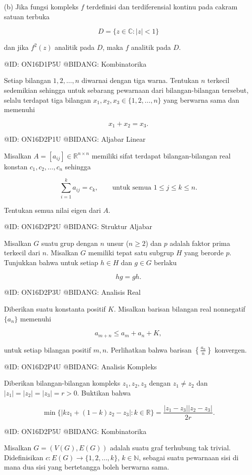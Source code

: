 (b) Jika fungsi kompleks $f$ terdefinisi dan terdiferensial kontinu pada cakram satuan terbuka

$$
D=\{z\in\mathbb C:|z|<1\}
$$

dan jika $f^2(z)$ analitik pada $D$, maka $f$ analitik pada $D$.

@ID: ON16D1P5U
@BIDANG: Kombinatorika

Setiap bilangan $1,2,\ldots,n$ diwarnai dengan tiga warna. Tentukan $n$ terkecil sedemikian sehingga untuk sebarang pewarnaan dari bilangan-bilangan tersebut, selalu terdapat tiga bilangan $x_1,x_2,x_3\in\{1,2,\ldots,n\}$ yang berwarna sama dan memenuhi

$$
x_1+x_2=x_3.
$$

@ID: ON16D2P1U
@BIDANG: Aljabar Linear

Misalkan $A=[a_{ij}]\in\mathbb R^{n\times n}$ memiliki sifat terdapat bilangan-bilangan real konstan $c_1,c_2,\ldots,c_n$ sehingga

$$
\sum_{i=1}^{k}a_{ij}=c_k,
\qquad
\text{untuk semua }1\le j\le k\le n.
$$

Tentukan semua nilai eigen dari $A$.

@ID: ON16D2P2U
@BIDANG: Struktur Aljabar

Misalkan $G$ suatu grup dengan $n$ unsur ($n\ge2$) dan $p$ adalah faktor prima terkecil dari $n$. Misalkan $G$ memiliki tepat satu subgrup $H$ yang berorde $p$. Tunjukkan bahwa untuk setiap $h\in H$ dan $g\in G$ berlaku

$$
hg=gh.
$$

@ID: ON16D2P3U
@BIDANG: Analisis Real

Diberikan suatu konstanta positif $K$. Misalkan barisan bilangan real nonnegatif $\{a_n\}$ memenuhi

$$
a_{m+n}\le a_m+a_n+K,
$$

untuk setiap bilangan positif $m,n$. Perlihatkan bahwa barisan $\left\{\frac{a_n}{n}\right\}$ konvergen.

@ID: ON16D2P4U
@BIDANG: Analisis Kompleks

Diberikan bilangan-bilangan kompleks $z_1,z_2,z_3$ dengan $z_1\ne z_2$ dan $|z_1|=|z_2|=|z_3|=r>0$. Buktikan bahwa

$$
\min\{|kz_1+(1-k)z_2-z_3|:k\in\mathbb R\}
=
\frac{|z_1-z_3||z_2-z_3|}{2r}.
$$

@ID: ON16D2P5U
@BIDANG: Kombinatorika

Misalkan $G=(V(G),E(G))$ adalah suatu graf terhubung tak trivial. Didefinisikan $c:E(G)\to\{1,2,\ldots,k\}$, $k\in\mathbb N$, sebagai suatu pewarnaan sisi di mana dua sisi yang bertetangga boleh berwarna sama.

